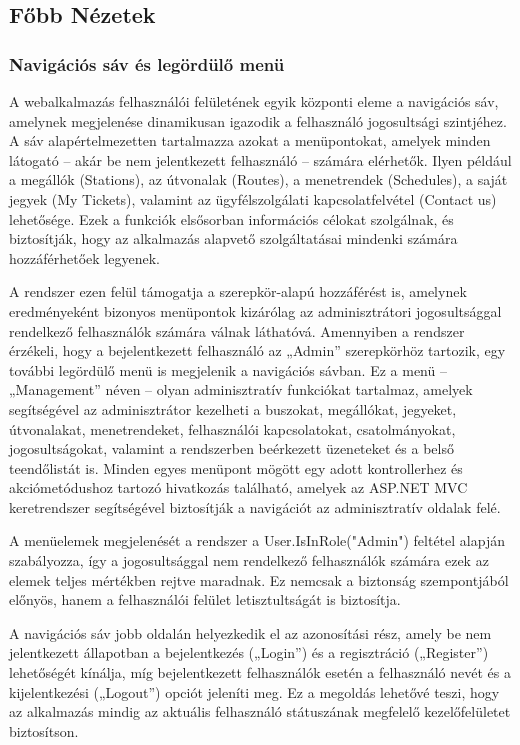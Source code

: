 \subsection{Főbb Nézetek}
\subsubsection{Navigációs sáv és legördülő menü }
A webalkalmazás felhasználói felületének egyik központi eleme a navigációs sáv, amelynek megjelenése dinamikusan igazodik a felhasználó jogosultsági szintjéhez. A sáv alapértelmezetten tartalmazza azokat a menüpontokat, amelyek minden látogató – akár be nem jelentkezett felhasználó – számára elérhetők. Ilyen például a megállók (Stations), az útvonalak (Routes), a menetrendek (Schedules), a saját jegyek (My Tickets), valamint az ügyfélszolgálati kapcsolatfelvétel (Contact us) lehetősége. Ezek a funkciók elsősorban információs célokat szolgálnak, és biztosítják, hogy az alkalmazás alapvető szolgáltatásai mindenki számára hozzáférhetőek legyenek.

A rendszer ezen felül támogatja a szerepkör-alapú hozzáférést is, amelynek eredményeként bizonyos menüpontok kizárólag az adminisztrátori jogosultsággal rendelkező felhasználók számára válnak láthatóvá. Amennyiben a rendszer érzékeli, hogy a bejelentkezett felhasználó az „Admin” szerepkörhöz tartozik, egy további legördülő menü is megjelenik a navigációs sávban. Ez a menü – „Management” néven – olyan adminisztratív funkciókat tartalmaz, amelyek segítségével az adminisztrátor kezelheti a buszokat, megállókat, jegyeket, útvonalakat, menetrendeket, felhasználói kapcsolatokat, csatolmányokat, jogosultságokat, valamint a rendszerben beérkezett üzeneteket és a belső teendőlistát is. Minden egyes menüpont mögött egy adott kontrollerhez és akciómetódushoz tartozó hivatkozás található, amelyek az ASP.NET MVC keretrendszer segítségével biztosítják a navigációt az adminisztratív oldalak felé.

A menüelemek megjelenését a rendszer a User.IsInRole("Admin") feltétel alapján szabályozza, így a jogosultsággal nem rendelkező felhasználók számára ezek az elemek teljes mértékben rejtve maradnak. Ez nemcsak a biztonság szempontjából előnyös, hanem a felhasználói felület letisztultságát is biztosítja.

A navigációs sáv jobb oldalán helyezkedik el az azonosítási rész, amely be nem jelentkezett állapotban a bejelentkezés („Login”) és a regisztráció („Register”) lehetőségét kínálja, míg bejelentkezett felhasználók esetén a felhasználó nevét és a kijelentkezési („Logout”) opciót jeleníti meg. Ez a megoldás lehetővé teszi, hogy az alkalmazás mindig az aktuális felhasználó státuszának megfelelő kezelőfelületet biztosítson.

